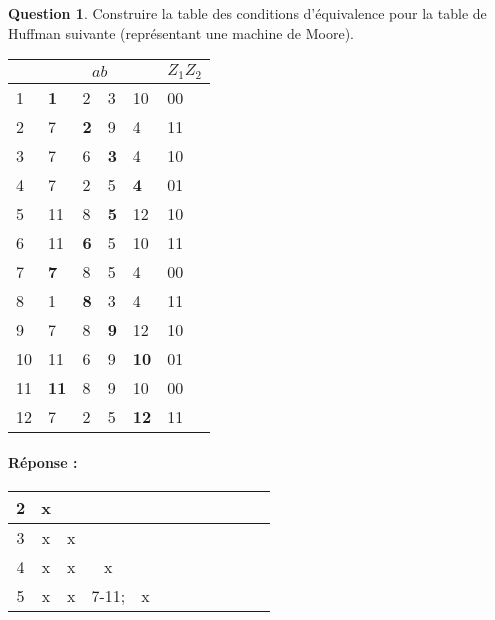 \documentclass[11pt,a4paper]{article}
\theoremstyle{definition}%
\newtheorem{Q}{Question}[] %
\newcommand{\reponse}[1]{%
	\ifthenelse {\boolean{corrige}} {\paragraph{Réponse :} \color{darkblue}   #1\color{black}} {}
 }
\begin{document}
\begin{Q}
	Construire la table des conditions d'équivalence pour la table de Huffman suivante (représentant une machine de Moore).
	\begin{center}
		\begin{tabular}{|l|l|l|l|l|l|} \hline
			& \multicolumn{4}{c|}{$ab$} & $Z_1Z_2$ \\ \hline
			1 & \textbf{1} & 2 & 3 & 10 & 00 \\ \hline
			2 & 7 & \textbf{2} & 9 & 4 & 11 \\ \hline
			3 & 7 & 6 & \textbf{3} & 4 & 10 \\ \hline
			4 & 7 & 2 & 5 & \textbf{4} & 01 \\ \hline
			5 & 11 & 8 & \textbf{5} & 12 & 10 \\ \hline
			6 & 11 & \textbf{6} & 5 & 10 & 11 \\ \hline
			7 & \textbf{7} & 8 & 5 & 4 & 00 \\ \hline
			8 & 1 & \textbf{8} & 3 & 4 & 11 \\ \hline
			9 & 7 & 8 & \textbf{9} & 12 & 10 \\ \hline
			10 & 11 & 6 & 9 & \textbf{10} & 01 \\ \hline
			11 & \textbf{11} & 8 & 9 & 10 & 00 \\ \hline
			12 & 7 & 2 & 5 & \textbf{12} & 11 \\ \hline
		\end{tabular}
	\end{center}
	\reponse{
		\begin{center}
			\begin{tabular}{|c|c|c|c|c|c|c|c|c|c|c|c|} \hline%
				2 & x & \cellcolor{gray!20} & \cellcolor{gray!20} & \cellcolor{gray!20} & \cellcolor{gray!20} & \cellcolor{gray!20} & \cellcolor{gray!20} & \cellcolor{gray!20} & \cellcolor{gray!20} & \cellcolor{gray!20} & \cellcolor{gray!20}\\ \hline
				3 & x & x & \cellcolor{gray!20} & \cellcolor{gray!20} & \cellcolor{gray!20} & \cellcolor{gray!20} & \cellcolor{gray!20} & \cellcolor{gray!20} & \cellcolor{gray!20} & \cellcolor{gray!20} & \cellcolor{gray!20}\\ \hline
				4 & x & x & x & \cellcolor{gray!20} & \cellcolor{gray!20} & \cellcolor{gray!20} & \cellcolor{gray!20} & \cellcolor{gray!20} & \cellcolor{gray!20} & \cellcolor{gray!20} & \cellcolor{gray!20}\\ \hline
				\multirow{3}{*}{5} & \multirow{3}{*}{x} & \multirow{3}{*}{x} & \cellcolor{red!25}7-11; & \multirow{3}{*}{x} & \cellcolor{gray!20} & \cellcolor{gray!20} & \cellcolor{gray!20} & \cellcolor{gray!20} & \cellcolor{gray!20} & \cellcolor{gray!20} & \cellcolor{gray!20}\\

\end{tabular}
\end{center}}
\end{Q}
\end{document}
